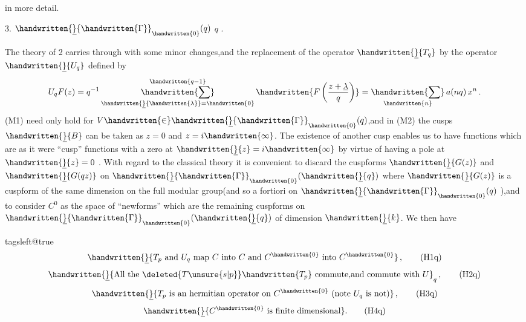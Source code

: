 in more detail.

3.   $\handwritten{\underline}{\handwritten{\Gamma}}_{\handwritten{0}}(q)$  $q$ .

The theory of \handwritten{\S}2 carries through with some minor changes,and the replacement of the operator $\handwritten{\underline}{T_q}$ by the operator $\handwritten{\underline}{U_q}$ defined by
\[
 U_q F(z)=q^{-1}\mathop{\handwritten{\sum}}\limits_{\handwritten{\underline}{\handwritten{\lambda}}=\handwritten{0}}^{\handwritten{q-1}} \handwritten{F\left(\frac{z+\underline{\lambda}}{q}\right)}=\mathop{\handwritten{\sum}}\limits_{\handwritten{n}}a(nq)\,x^n\,.
\]
(M1) need only hold for $V \handwritten{\in}\handwritten{\underline}{\handwritten{\Gamma}}_{\handwritten{0}}(q)$,and in (M2) the  cusps $\handwritten{\underline}{B}$ can be taken as $z=0$ and $z=i\handwritten{\infty}$. The existence of another cusp enables us to have functions which are as it were ``cusp'' functions with a zero at $\handwritten{\underline}{z}=i\handwritten{\infty}$ by virtue of having a pole at $\handwritten{\underline}{z}=0$ . With regard to the classical theory it is convenient to discard the cuspforms $\handwritten{\underline}{G(z)}$ and $\handwritten{\underline}{G(qz)}$ on $\handwritten{\underline}{\handwritten{\Gamma}}_{\handwritten{0}}(\handwritten{\underline}{q})$ where $\handwritten{\underline}{G(z)}$ is a cuspform of the same dimension on the full modular group(and so a fortiori on $\handwritten{\underline}{\handwritten{\Gamma}}_{\handwritten{0}}(q)$ ),and to consider $C^0$ as the space of ``newforms'' which are the remaining cuspforms on $\handwritten{\underline}{\handwritten{\Gamma}}_{\handwritten{0}}(\handwritten{\underline}{q})$ of dimension $\handwritten{\underline}{k}$. We then have

\begingroup\csname tagsleft@true\endcsname
\[
 \handwritten{\underline}{T_p\text{ and }U_q\text{ map }C\text{ into }C\text{ and }C^{\handwritten{0}}\text{ into }C^{\handwritten{0}}}\,, \tag*{(H1q)}
\]
\[
 \handwritten{\underline}{\text{All the } \deleted{T\unsure{s|p}}\handwritten{T_p}\text{ commute,and commute with }U}_{q}\,, \tag*{(H2q)}
\]
\[
 \handwritten{\underline}{T_p\text{ is an hermitian operator on }C^{\handwritten{0}}\text{ (note }U_q\text{ is not)}}\,, \tag*{(H3q)}
\]
\[
 \handwritten{\underline}{C^{\handwritten{0}}\text{ is finite dimensional}}. \tag*{(H4q)}
\]
\endgroup

